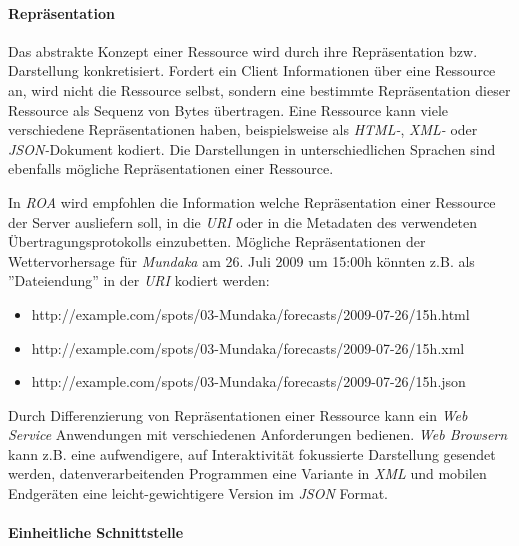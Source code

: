 \paragraph{Repräsentation}

Das abstrakte Konzept einer Ressource wird durch ihre Repräsentation
bzw. Darstellung konkretisiert. Fordert ein Client Informationen über
eine Ressource an, wird nicht die Ressource selbst, sondern eine
bestimmte Repräsentation dieser Ressource als Sequenz von Bytes
übertragen. Eine Ressource kann viele verschiedene Repräsentationen
haben, beispielsweise als \textit{HTML-},
 \textit{XML-} oder
\textit{JSON-}Dokument 
kodiert. Die Darstellungen in unterschiedlichen Sprachen sind
ebenfalls mögliche Repräsentationen einer Ressource. 

In \textit{ROA} wird empfohlen die Information welche Repräsentation
einer Ressource der Server ausliefern soll, in die \textit{URI} oder
in die Metadaten des verwendeten Übertragungsprotokolls
einzubetten. Mögliche Repräsentationen der Wettervorhersage für
\textit{Mundaka} am 26. Juli 2009 um 15:00h könnten z.B. als
''Dateiendung'' in der \textit{URI} kodiert werden:

\begin{itemize}
\item http://example.com/spots/03-Mundaka/forecasts/2009-07-26/15h.html
\item http://example.com/spots/03-Mundaka/forecasts/2009-07-26/15h.xml
\item http://example.com/spots/03-Mundaka/forecasts/2009-07-26/15h.json
\end{itemize}

Durch Differenzierung von Repräsentationen einer Ressource kann ein
\textit{Web Service} Anwendungen mit verschiedenen Anforderungen
bedienen. \textit{Web Browsern} kann z.B. eine aufwendigere, auf
Interaktivität fokussierte Darstellung gesendet werden,
datenverarbeitenden Programmen eine Variante in \textit{XML} und
mobilen Endgeräten eine leicht-gewichtigere Version im \textit{JSON}
Format.

\paragraph{Einheitliche Schnittstelle}

